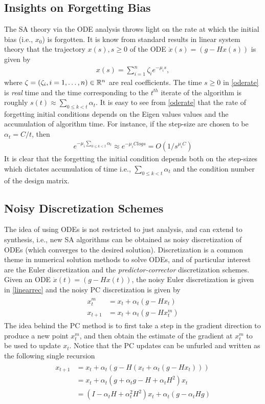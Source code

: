 \subsection{Insights on Forgetting Bias}
The SA theory via the ODE analysis throws light on the rate at which the initial bias (i.e., $x_0$) is forgotten. It is know from standard results in linear system theory that the trajectory $x(s),s\geq 0$ of the ODE $\dot{x}(s)=(g-Hx(s))$ is given by
\begin{align}\label{oderate}
x(s)=\sum_{i=1}^n \zeta_i e^{-\mu_i s}, 
\end{align}
where $\zeta=(\zeta_i,i=1,\ldots,n)\in \mathbb{R}^n$ are real coefficients. The time $s\geq 0$ in \eqref{oderate} is \emph{real} time and the time corresponding to the $t^{th}$ iterate of the algorithm is roughly $s(t)\approx\sum_{0\leq k<t}\alpha_t$. It is easy to see from \eqref{oderate} that the rate of forgetting initial conditions depends on the Eigen values values and the accumulation of algorithm time. For instance, if the step-size are chosen to be $\alpha_t=C/t$, then \begin{align}\label{biasforget}e^{-\mu_i\sum_{0\leq k<t}\alpha_t}\approx e^{-\mu_i Clog s}=O(1/s^{\mu_i C})\end{align}
It is clear that the forgetting the initial condition depends both on the step-sizes which dictates accumulation of time i.e., $\sum_{0\leq k<t}\alpha_t$ and the condition number of the design matrix. 
\subsection{Noisy Discretization Schemes}
The idea of using ODEs is not restricted to just analysis, and can extend to synthesis, i.e., new SA algorithms can be obtained as noisy discretization of ODEs (which converges to the desired solution). Discretization is a common theme in numerical solution methods to solve ODEs, and of particular interest are the Euler discretization and the \emph{predictor-corrector} discretization schemes. Given an ODE $\dot{x}(t)=(g-Hx(t))$, the noisy Euler discretization is given in \eqref{linearrec} and the noisy PC discretization is given by
\begin{align}\label{PC}
\begin{split}
x^m_{t}&=x_t+\alpha_t(g-Hx_t)\\
x_{t+1}&=x_t+\alpha_t(g-Hx^m_t)
\end{split}
\end{align}
The idea behind the PC method is to first take a step in the gradient direction to produce a new point $x^m_t$, and then obtain the estimate of the gradient at $x^m_t$ to be used to update $x_t$. Notice that the PC updates can be unfurled and written as the following single recursion
\begin{align*}
\begin{split}
x_{t+1}&=x_t+\alpha_t(g-H(x_t+\alpha_t(g-Hx_t)))\\
&=x_t+\alpha_t(g+\alpha_t g- H +\alpha_t H^2)x_t \\
&= (I-\alpha_t H+\alpha_t^2 H^2)x_t+\alpha_t(g-\alpha_t H g)
\end{split}
\end{align*}
